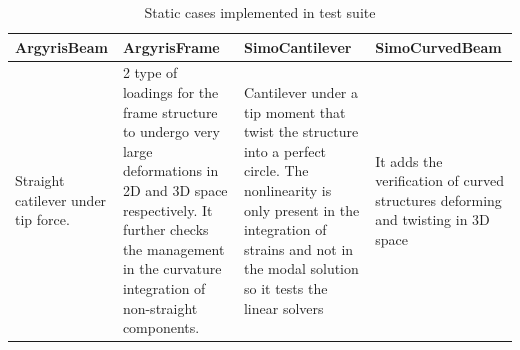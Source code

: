 \documentclass[11pt]{article}
\begin{document}
\begin{table}[h!]
\begin{center}
\caption{Static cases implemented in test suite}
\label{table:static_cases}
\begin{tabular}{llll}
  \toprule
  \textbf{ArgyrisBeam} & \textbf{ArgyrisFrame} & \textbf{SimoCantilever} & \textbf{SimoCurvedBeam}\\
  \midrule
  \parbox{4cm}{Straight catilever under tip force.}
               & \parbox{4cm}{2 type of loadings for the frame structure to
                 undergo very large deformations in 2D and 3D space respectively.
                 It further checks the management in the curvature integration of non-straight components.}
                               & \parbox{4cm}{Cantilever under a tip moment that twist the structure into a perfect circle. The nonlinearity is only present in the integration of strains and not in the modal solution so it tests the linear solvers}
                                                          & \parbox{4cm}{It adds the verification of curved structures deforming and twisting in 3D space} \\
                                 \bottomrule
\end{tabular}
\end{center}
\end{table}
\end{document}
